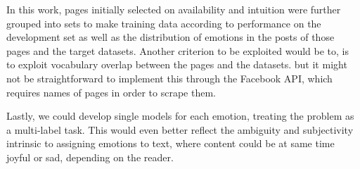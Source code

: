 \documentclass[11pt]{article}
\begin{document}
In this work, pages initially selected on availability and intuition were further grouped into sets to make training data according to performance on the development set as well as the distribution of emotions in the posts of those pages and the target datasets. Another criterion to be exploited would be to, is to exploit vocabulary overlap between the pages and the datasets. but it might not be straightforward to implement this through the Facebook API, which requires names of pages in order to scrape them.

Lastly, we could develop single models for each emotion, treating the problem as a multi-label task. This would even better reflect the ambiguity  and subjectivity intrinsic to assigning emotions to text, where content could be at same time joyful or sad, depending on the reader.






%


\end{document}
